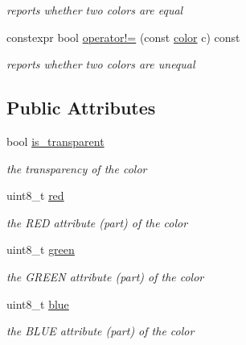\begin{DoxyCompactItemize}
\begin{DoxyCompactList}\small\item\em reports whether two colors are equal \end{DoxyCompactList}\item 
\mbox{\label{classhwlib_1_1color_af4c0560e4fbd233b4a2fbc922ed5528a}} 
constexpr bool \hyperlink{classhwlib_1_1color_af4c0560e4fbd233b4a2fbc922ed5528a}{operator!=} (const \hyperlink{classhwlib_1_1color}{color} c) const
\begin{DoxyCompactList}\small\item\em reports whether two colors are unequal \end{DoxyCompactList}\end{DoxyCompactItemize}
\subsection*{Public Attributes}
\begin{DoxyCompactItemize}
\item 
bool \hyperlink{classhwlib_1_1color_a2bb850a5013f0f4a78b29bd09444fb21}{is\+\_\+transparent}
\begin{DoxyCompactList}\small\item\em the transparency of the color \end{DoxyCompactList}\item 
\mbox{\label{classhwlib_1_1color_a63b0cdaa1bc446995cc8b8724a2ab866}} 
uint8\+\_\+t \hyperlink{classhwlib_1_1color_a63b0cdaa1bc446995cc8b8724a2ab866}{red}
\begin{DoxyCompactList}\small\item\em the R\+ED attribute (part) of the color \end{DoxyCompactList}\item 
\mbox{\label{classhwlib_1_1color_ab87f25b9aba71151e056b570e7304c89}} 
uint8\+\_\+t \hyperlink{classhwlib_1_1color_ab87f25b9aba71151e056b570e7304c89}{green}
\begin{DoxyCompactList}\small\item\em the G\+R\+E\+EN attribute (part) of the color \end{DoxyCompactList}\item 
\mbox{\label{classhwlib_1_1color_a9d57edec257fb2626157befb791a6a96}} 
uint8\+\_\+t \hyperlink{classhwlib_1_1color_a9d57edec257fb2626157befb791a6a96}{blue}
\begin{DoxyCompactList}\small\item\em the B\+L\+UE attribute (part) of the color \end{DoxyCompactList}\end{DoxyCompactItemize}
